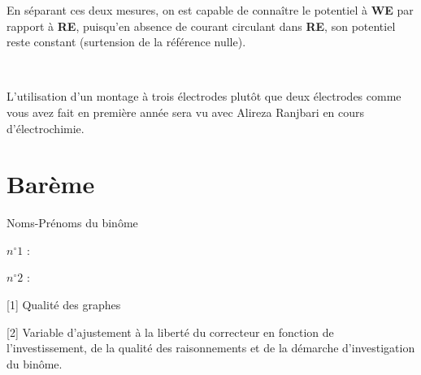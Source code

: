 \documentclass[twoside,a4paper,11pt,addpoints]{exam}%
\newcounter{foo} %
\begin{document}
En séparant ces deux mesures, on est capable de connaître le potentiel à \textbf{WE} par rapport à \textbf{RE}, puisqu'en absence de courant circulant dans \textbf{RE}, son potentiel reste constant (surtension de la référence nulle).

~

{\Large \faWarning} L'utilisation d'un montage à trois électrodes plutôt que deux électrodes comme vous avez fait en première année sera vu avec Alireza Ranjbari en cours d'électrochimie.


\newpage

\section*{Barème}

\begin{minipage}{0.33\textwidth}
Noms-Prénoms du binôme
\end{minipage}\begin{minipage}{0.33\textwidth}
$n^\circ 1$ :
\end{minipage}\begin{minipage}{0.33\textwidth}
$n^\circ 2$ :
\end{minipage}

\begin{questions}
\setcounter{question}{\thefoo}

[1] Qualité des graphes

[2] Variable d'ajustement à la liberté du correcteur en fonction de l'investissement, de la qualité des raisonnements et de la démarche d'investigation du binôme.
\end{questions}

\begin{center}
\gradetable
\end{center}
\end{document}
